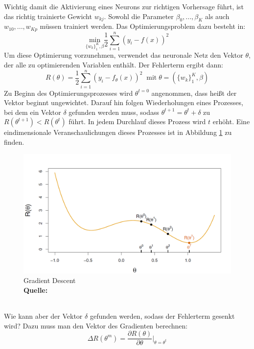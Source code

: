 \documentclass[a4paper,12pt]{thesis}
\newcommand*{\captionsource}[2]{%
	\caption[{#1}]{%
		#1%
		\\\hspace{\linewidth}%
		\textbf{Quelle:} #2%
	}%
}
\begin{document}
Wichtig damit die Aktivierung eines Neurons zur richtigen Vorhersage führt, ist das richtig trainierte Gewicht $w_{kj}$. Sowohl die Parameter $\beta_0, ..., \beta_K$ als auch $w_{10}, ..., w_{Kp}$ müssen trainiert werden. Das Optimierungsproblem dazu besteht in:
\begin{equation}
	\label{NN:Optimization}
	\underset{ \{ w_k \}^K_1 , \beta }{\text{min}}\frac{1}{2}\sum_{i=1}^n (y_i-f(x))^2
\end{equation}
Um diese Optimierung vorzunehmen, verwendet das neuronale Netz den Vektor $\theta$, der alle zu optimierenden Variablen enthält. Der Fehlerterm ergibt dann:
\begin{equation}
	\label{NN:ErrorTerm}
	R(\theta)=\frac{1}{2}\sum_{i=1}^n (y_i-f_{\theta}(x))^2 \; \; \text{mit} \; \theta=(\{ w_k \}^K_1,\beta)
\end{equation}
Zu Beginn des Optimierungsprozesses wird $\theta^{t=0}$ angenommen, dass heißt der Vektor beginnt ungewichtet. Darauf hin folgen Wiederholungen eines Prozesses, bei dem ein Vektor $\delta$ gefunden werden muss, sodass $\theta^{t+1}=\theta^t + \delta$ zu $R(\theta^{t+1})<R(\theta^t)$ führt. In jedem Durchlauf dieses Prozess wird $t$ erhöht. Eine eindimensionale Veranschaulichungen dieses Prozesses ist in Abbildung \ref{NN3} zu finden.
\begin{figure}[!ht]
	\centering
	\includegraphics[width=14cm]{Plots/NN3.png}
	\captionsource{Gradient Descent}{
		\cite{James2013DL}
	}
	\label{NN3}
\end{figure}\\
Wie kann aber der Vektor $\delta$ gefunden werden, sodass der Fehlerterm gesenkt wird? Dazu muss man den Vektor des Gradienten berechnen:
\begin{equation}
	\label{NN:GradientVector}
	\Delta R(\theta^m)=\frac{\partial R(\theta)}{\partial \theta}|_{\theta=\theta^t}
\end{equation}
\end{document}

